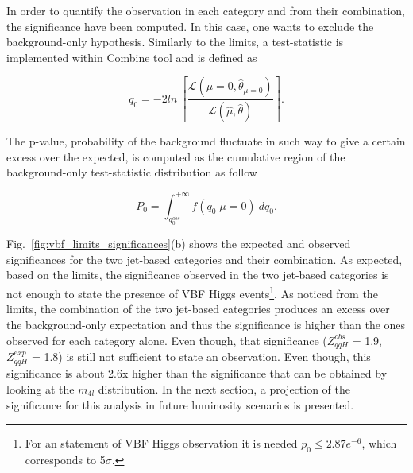 In order to quantify the observation in each category and from their combination, the significance have been computed. In this case, one wants to exclude the background-only hypothesis. Similarly to the limits, a test-statistic is implemented within Combine tool and is defined as

\begin{equation}
q_{0} = -2ln ~\left[ \frac{\mathcal{L}(\mu=0,\hat{\theta}_{\mu=0})}{\mathcal{L}(\hat{\mu},\hat{\theta})} \right].
\end{equation}

The p-value, probability of the background fluctuate in such way to give a certain excess over the expected, is computed as the cumulative region of the background-only test-statistic distribution as follow

\begin{equation}
P_{0} = \int_{q_{0}^{obs}}^{+\infty} \mathit{f}(q_{0}|\mu=0)~dq_{0}.
\end{equation}

Fig.~\ref{fig:vbf_limits_significances}(b) shows the expected and observed significances for the two jet-based categories and their combination. As expected, based on the limits, the significance observed in the two jet-based categories is not enough to state the presence of VBF Higgs events\footnote{For an statement of VBF Higgs observation it is needed $p_{0} \leq 2.87e^{-6}$, which corresponds to 5$\sigma$.}. As noticed from the limits, the combination of the two jet-based categories produces an excess over the background-only expectation and thus the significance is higher than the ones observed for each category alone. Even though, that significance ($Z_{qqH}^{obs}$ = 1.9, $Z_{qqH}^{exp}$ = 1.8) is still not sufficient to state an observation. Even though, this significance is about 2.6x higher than the significance that can be obtained by looking at the $m_{4l}$ distribution. In the next section, a projection of the significance for this analysis in future luminosity scenarios is presented.

